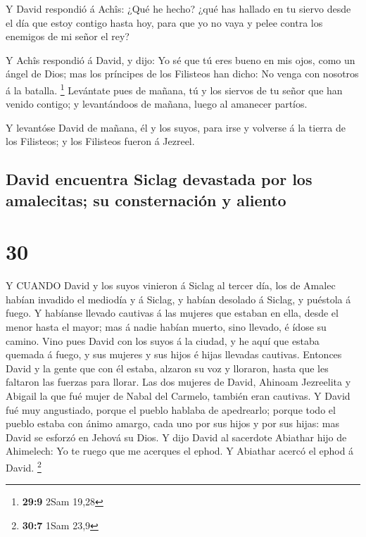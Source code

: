  Y David respondió á Achîs: ¿Qué he hecho? ¿qué has hallado
en tu siervo desde el día que estoy contigo hasta hoy, para que yo no
vaya y pelee contra los enemigos de mi señor el rey?

 Y Achîs respondió á David, y dijo: Yo sé que tú eres bueno
en mis ojos, como un ángel de Dios; mas los príncipes de los Filisteos
han dicho: No venga con nosotros á la batalla. \footnote{\textbf{29:9}
  2Sam 19,28}  Levántate pues de mañana, tú y los siervos
de tu señor que han venido contigo; y levantándoos de mañana, luego al
amanecer partíos.

 Y levantóse David de mañana, él y los suyos, para irse y
volverse á la tierra de los Filisteos; y los Filisteos fueron á Jezreel.

\hypertarget{david-encuentra-siclag-devastada-por-los-amalecitas-su-consternaciuxf3n-y-aliento}{%
\subsection{David encuentra Siclag devastada por los amalecitas; su
consternación y
aliento}\label{david-encuentra-siclag-devastada-por-los-amalecitas-su-consternaciuxf3n-y-aliento}}

\hypertarget{section-29}{%
\section{30}\label{section-29}}

 Y CUANDO David y los suyos vinieron á Siclag al tercer día,
los de Amalec habían invadido el mediodía y á Siclag, y habían desolado
á Siclag, y puéstola á fuego.  Y habíanse llevado cautivas á
las mujeres que estaban en ella, desde el menor hasta el mayor; mas á
nadie habían muerto, sino llevado, é ídose su camino.  Vino
pues David con los suyos á la ciudad, y he aquí que estaba quemada á
fuego, y sus mujeres y sus hijos é hijas llevadas cautivas. 
Entonces David y la gente que con él estaba, alzaron su voz y lloraron,
hasta que les faltaron las fuerzas para llorar.  Las dos
mujeres de David, Ahinoam Jezreelita y Abigail la que fué mujer de Nabal
del Carmelo, también eran cautivas.  Y David fué muy
angustiado, porque el pueblo hablaba de apedrearlo; porque todo el
pueblo estaba con ánimo amargo, cada uno por sus hijos y por sus hijas:
mas David se esforzó en Jehová su Dios.  Y dijo David al
sacerdote Abiathar hijo de Ahimelech: Yo te ruego que me acerques el
ephod. Y Abiathar acercó el ephod á David. \footnote{\textbf{30:7} 1Sam
  23,9}

